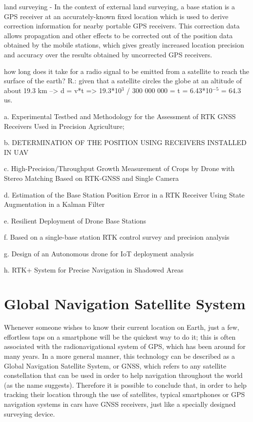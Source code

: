 \begin{itemize}
        land surveying - In the context of external land surveying, a base station is a GPS receiver at an accurately-known fixed location which is used to derive correction information for nearby portable GPS receivers. This correction data allows propagation and other effects to be corrected out of the position data obtained by the mobile stations, which gives greatly increased location precision and accuracy over the results obtained by uncorrected GPS receivers.

        how long does it take for a radio signal to be emitted from a satellite to reach the surface of the earth? 
        R.: given that a satellite circles the globe at an altitude of about 19.3 km --> d = v*t => 19.3*10$^3$ / 300 000 000 = t = 6.43*10$^{-5}$ = 64.3 us.

    a. Experimental Testbed and Methodology for the
    Assessment of RTK GNSS Receivers Used
    in Precision Agriculture;

    b. DETERMINATION OF THE POSITION USING
    RECEIVERS INSTALLED IN UAV

    c. High-Precision/Throughput Growth Measurement of
    Crops by Drone with Stereo Matching Based on
    RTK-GNSS and Single Camera

    d. Estimation of the Base Station Position Error in a
    RTK Receiver Using State Augmentation in a
    Kalman Filter

    e. Resilient Deployment of Drone Base Stations

    f. Based on a single-base station RTK control survey
    and precision analysis 

    g. Design of an Autonomous drone for IoT deployment
    analysis 

    h. RTK+ System for Precise Navigation in Shadowed
    Areas 
\end{itemize}

\section{Global Navigation Satellite System}\label{sec:II_gnss}

Whenever someone wishes to know their current location on Earth, just a few, effortless taps on a smartphone will be the quickest way to do it; this is often associated with the radionavigational system of GPS, which has been around for many years. In a more general manner, this technology can be described as a Global Navigation Satellite System, or GNSS, which refers to any satellite constellation that can be used in order to help navigation throughout the world (as the name suggests).
Therefore it is possible to conclude that, in order to help tracking their location through the use of satellites, typical smartphones or GPS navigation systems in cars have GNSS receivers, just like a specially designed surveying device.

